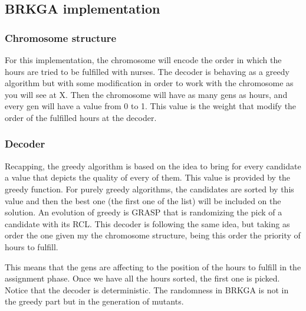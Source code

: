 \subsection{BRKGA implementation}

\subsubsection{Chromosome structure}

For this implementation, the chromosome will encode the order in which the hours are tried to be fulfilled with nurses. The decoder is behaving as a greedy algorithm but with some modification in order to work with the chromosome as you will see at X. Then the chromosome will have as many gens as hours, and every gen will have a value from 0 to 1. This value is the weight that modify the order of the fulfilled hours at the decoder.



\subsubsection{Decoder}

Recapping, the greedy algorithm is based on the idea to bring for every candidate a value that depicts the quality of every of them. This value is provided by the greedy function. For purely greedy algorithms, the candidates are sorted by this value and then the best one (the first one of the list) will be included on the solution. An evolution of greedy is GRASP that is randomizing the pick of a candidate with its RCL. This decoder is following the same idea, but taking as order the one given my the chromosome structure, being this order the priority of hours to fulfill.

This means that the gens are affecting to the position of the hours to fulfill in the assignment phase. Once we have all the hours sorted, the first one is picked. Notice that the decoder is deterministic. The randomness in BRKGA is not in the greedy part but in the generation of mutants.


